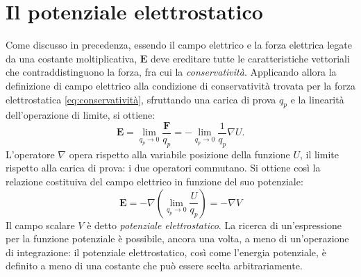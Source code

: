 \documentclass[a4paper,11pt]{report}
\begin{document}
\section{Il potenziale elettrostatico}
Come discusso in precedenza, essendo il campo elettrico e la forza elettrica legate da una costante moltiplicativa, $\bm{E}$ deve ereditare tutte le caratteristiche vettoriali che contraddistinguono la forza, fra cui la \emph{conservatività}. Applicando allora la definizione di campo elettrico alla condizione di conservatività trovata per la forza elettrostatica \eqref{eq:conservatività}, sfruttando una carica di prova $q_p$ e la linearità dell'operazione di limite, si ottiene:
\begin{equation}
\bm{E} = \lim_{q_p \rightarrow 0} \frac{\bm{F}}{q_p} = -\lim_{q_p \rightarrow 0} \frac{1}{q_p} \nabla U.
\end{equation}
L'operatore $\nabla$ opera rispetto alla variabile posizione della funzione $U$, il limite rispetto alla carica di prova: i due operatori commutano. Si ottiene così la relazione costituiva del campo elettrico in funzione del suo potenziale:
\begin{equation} 
\boxed{\bm{E} = -\nabla (\lim_{q_p \rightarrow 0}  \frac{U}{q_p}) = -\nabla V}
\label{eq:potenziale}
\end{equation}
Il campo scalare $V$ è detto \textit{potenziale elettrostatico}. 
La ricerca di un'espressione per la funzione potenziale è possibile, ancora una volta, a meno di un'operazione di integrazione: {il potenziale elettrostatico}, così come l'energia potenziale, {è definito a meno di una costante} che può essere scelta arbitrariamente. 
\end{document}

